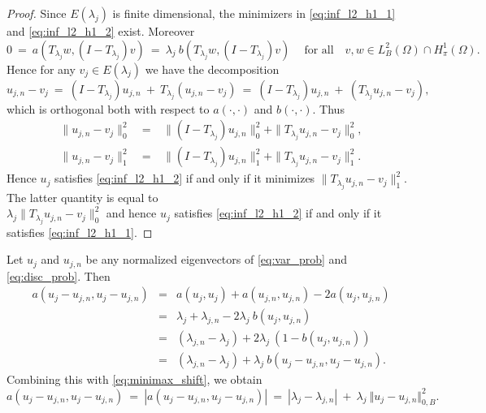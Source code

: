 \documentclass[preprint,12pt]{elsarticle}
\newcommand{\cB}{{B}}
\begin{document}
\begin{proof}
{Since $E(\lambda_j)$ is
finite dimensional,   
the minimizers in \eqref{eq:inf_l2_h1_1} and \eqref{eq:inf_l2_h1_2}
exist. Moreover 
\begin{equation}\label{eq:l2_ortho_1}
0  \ = \ a(T_{\lambda_j} w, (I-T_{\lambda_j}) v) \ =\
\lambda_j\ b(T_{\lambda_j} w, (I-T_{\lambda_j}) v) \   \quad \text{for all} \quad 
v,w\in L^2_\cB(\Omega)\cap H_{\pi}^1(\Omega).
\end{equation}
Hence for any $v_j \in E(\lambda_j)$ we have the decomposition   
$$u_{j,n}-v_j\ = \ (I-T_{\lambda_j})u_{j,n}\ +\ T_{\lambda_j} (u_{j,n}-v_j)
\ = \  (I-T_{\lambda_j})u_{j,n}\ +\ (T_{\lambda_j} u_{j,n}-v_j) ,
$$
which is orthogonal both with respect to $a(\cdot, \cdot)$
and $b(\cdot, \cdot)$. Thus 
\begin{eqnarray*}
\|u_{j,n}-v_j\|_{0}^2\ & = & \ 
\|(I-T_{\lambda_j})u_{j,n}\|_{0}^2 +
\|T_{\lambda_j} u_{j,n}-v_j\|_{0}^2,\\
\|u_{j,n}-v_j\|_{1}^2\ & = & \ 
\|(I-T_{\lambda_j})u_{j,n}\|_{1}^2 +
\|T_{\lambda_j} u_{j,n}-v_j\|_{1}^2 .
\end{eqnarray*}
Hence $u_j$  satisfies \eqref{eq:inf_l2_h1_2}  if and only if it minimizes 
$\|T_{\lambda_j}u_{j,n}-v_j\|_{1}^2$.  The latter quantity is
equal to \\$\lambda_j \|T_{\lambda_j}u_{j,n}-v_j\|_{0}^2$
and hence $u_j$ satisfies  \eqref{eq:inf_l2_h1_2} if and only
if it satisfies \eqref{eq:inf_l2_h1_1}.}

\end{proof}

Let $u_j$ and $u_{j,n}$ be any
normalized eigenvectors of \eqref{eq:var_prob}
and \eqref{eq:disc_prob}.
Then
\begin{eqnarray}
\label{eq:basic1} a(u_j - u_{j,n}, u_j - u_{j,n}) &=& a(u_j,u_j) +
a(u_{j,n},u_{j,n})
- 2 a(u_{j},u_{j,n})\nonumber\\
&=&    \lambda_j +  \lambda_{j,n} -  2\lambda_j \ b(u_{j},u_{j,n})
\nonumber\\
&=&      (\lambda_{j,n} - \lambda_j)  +2  \lambda_j\ (1-b(u_{j},u_{j,n}))\nonumber\\
&=&
(\lambda_{j,n} - \lambda_j)  +\lambda_j\
b(u_{j}-u_{j,n},u_{j}-u_{j,n} ) .
\end{eqnarray}
Combining this with \eqref{eq:minimax_shift}, we obtain
\begin{equation}
a(u_j-u_{j,n},u_j-u_{j,n}) \ =\ |a(u_j-u_{j,n},u_j-u_{j,n})|\ =\  |\lambda_j-\lambda_{j,n}| \ + \
\lambda_j \ \Vert u_{j}-u_{j,n}\Vert_{0,\cB}^2.
\label{eq:basic2}
\end{equation}
\end{document}
